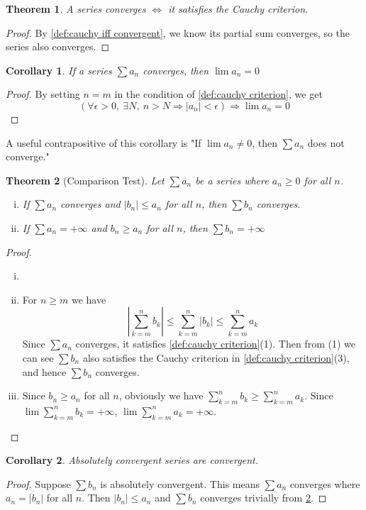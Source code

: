 \documentclass[12pt, lettersize]{book}
\theoremstyle{plain}
\newtheorem{thm}{Theorem}[section]
\newtheorem{cor}{Corollary}[thm]
\theoremstyle{definition}
\theoremstyle{remark}
\begin{document}
		\begin{thm}
		A series converges $\iff$ it satisfies the Cauchy criterion. 
		\end{thm}
		\begin{proof}
		By \ref{def:cauchy iff convergent}, we know its partial sum converges, so the series also converges.
		\end{proof}
		\begin{cor}\label{def:If a_n converges then lim(a_n)=0}
		If a series $\sum a_n$ converges, then $\lim a_n=0$
		\end{cor}
		\begin{proof}
		By setting $n=m$ in the condition of \ref{def:cauchy criterion}, we get
		\begin{displaymath}
			\left(\forall\epsilon>0,\ \exists N,\ n>N\Rightarrow\left|a_n\right|<\epsilon\right)\Rightarrow\lim a_n=0
		\end{displaymath}
		\end{proof}
		A useful contrapositive of this corollary is "If $\lim a_n\neq0$, then $\sum a_n$ does not converge."
		
		\setcounter{equation}{0}
		\begin{thm}[Comparison Test]\label{def:Comparison Test}
		Let $\sum a_n$ be a series where $a_n\geq0$ for all $n$.
		\begin{enumerate}[(i)]
			\item If $\sum a_n$ converges and $|b_n|\leq a_n$ for all $n$, then $\sum b_n$ converges.
			\item If $\sum a_n=+\infty$ and $b_n\geq a_n$ for all $n$, then $\sum b_n=+\infty$
		\end{enumerate}
		\end{thm}
		\begin{proof}
		\begin{enumerate}[(i)]
			\item[]
			\item For $n\geq m$ we have
			\begin{equation}
				\left|\sum_{k=m}^{n}b_k\right|\leq\sum_{k=m}^{n}|b_k|\leq\sum_{k=m}^{n}a_k
			\end{equation} 
			Since $\sum a_n$ converges, it satisfies \ref{def:cauchy criterion}(1). Then from (1)  we can see $\sum b_n$
			also satisfies the Cauchy criterion in \ref{def:cauchy criterion}(3), and hence $\sum b_n$ converges.
			\item Since $b_n\geq a_n$ for all $n$, obviously we have $\sum_{k=m}^{n}b_k\geq\sum_{k=m}^{n}a_k$. Since $\lim\sum_{k=m}^{n}b_k=+\infty$, $\lim\sum_{k=m}^{n}a_k=+\infty$.			
		\end{enumerate}
		\end{proof}
		\begin{cor}
		Absolutely convergent series are convergent.
		\end{cor}
		\begin{proof}
		Suppose $\sum b_n$ is absolutely convergent. This means $\sum a_n$ converges where $a_n=|b_n|$ for all $n$. Then
		$|b_n|\leq a_n$ and $\sum b_n$ converges trivially from \ref{def:Comparison Test}.
		\end{proof}
		
\end{document}
